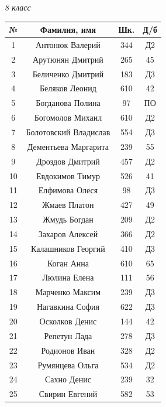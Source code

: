 \documentclass[12pt]{article}
\newlength{\h}
\newlength{\x}
\begin{document}
\begin{table}[ht]
  \begin{minipage}[t]{0.48\linewidth}\centering
    \begin{center}
      \textit{8 класс}
    \end{center}
    \begin{tabular}[h]{|c|c|c|c|}
      \hline
      \textbf{№} & \textbf{Фамилия, имя} & \textbf{Шк.} & \textbf{Д/б}\\
      \hline
      1 & Антонюк Валерий & 344 & Д2\\ \hline
      2 & Арутюнян Дмитрий & 265 & 45 \\ \hline
      3 & Беличенко Дмитрий & 183 & Д3 \\ \hline
      4 & Беляков Леонид & 610 & 42 \\ \hline
      5 & Богданова Полина & 97 & ПО \\ \hline
      6 & Богомолов Михаил & 610 & Д2 \\ \hline
      7 & Болотовский Владислав & 554 & Д3 \\ \hline
      8 & Дементьева Маргарита & 239 & 55 \\ \hline
      9 & Дроздов Дмитрий & 457 & Д2 \\ \hline
      10 & Евдокимов Тимур & 526 & 41 \\ \hline
      11 & Елфимова Олеся & 98 & Д3 \\ \hline
      12 & Жмаев Платон & 427 & 49 \\ \hline
      13 & Жмудь Богдан & 209 & Д2 \\ \hline
      14 & Захаров Алексей & 366 & Д2 \\ \hline
      15 & Калашников Георгий & 410 & Д3 \\ \hline
      16 & Коган Анна & 610 & 65 \\ \hline
      17 & Люлина Елена & 111 & 56 \\ \hline
      18 & Марченко Максим & 239 & Д3 \\ \hline
      19 & Нагавкина София & 622 & Д3 \\ \hline
      20 & Осколков Денис & 144 & 42 \\ \hline
      21 & Репетун Лада & 278 & Д3 \\ \hline
      22 & Родионов Иван & 328 & Д2 \\ \hline
      23 & Румянцева Ольга & 534 & Д2 \\ \hline
      24 & Сахно Денис & 239 & 32 \\ \hline
      25 & Свирин Евгений & 582 & 53 \\ \hline

\end{tabular}
\end{minipage}
\end{table}
\end{document}
